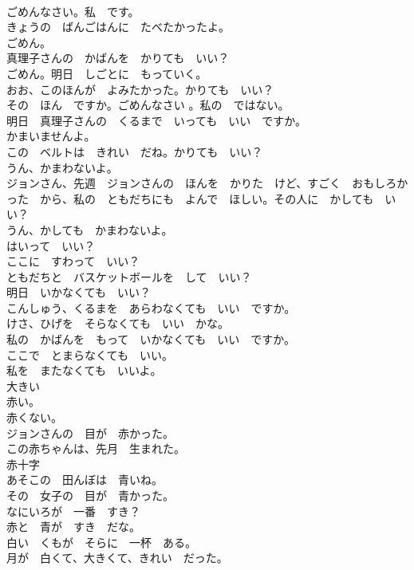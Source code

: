 \documentclass[8pt]{extreport}
\begin{document}
\begin{CJK}{UTF8}{min}
\\	ごめんなさい。私　です。	
\\	きょうの　ばんごはんに　たべたかったよ。	
\\	ごめん。	
\\	真理子さんの　かばんを　かりても　いい？	
\\	ごめん。明日　しごとに　もっていく。	
\\	おお、このほんが　よみたかった。かりても　いい？	
\\	その　ほん　ですか。ごめんなさい 。私の　ではない。	
\\	明日　真理子さんの　くるまで　いっても　いい　ですか。	
\\	かまいませんよ。	
\\	この　ベルトは　きれい　だね。かりても　いい？	
\\	うん、かまわないよ。	
\\	ジョンさん、先週　ジョンさんの　ほんを　かりた　けど、すごく　おもしろかった　から、私の　ともだちにも　よんで　ほしい。その人に　かしても　いい？	
\\	うん、かしても　かまわないよ。	
\\	はいって　いい？	
\\	ここに　すわって　いい？	
\\	ともだちと　バスケットボールを　して　いい？	
\\	明日　いかなくても　いい？	
\\	こんしゅう、くるまを　あらわなくても　いい　ですか。	
\\	けさ、ひげを　そらなくても　いい　かな。	
\\	私の　かばんを　もって　いかなくても　いい　ですか。	
\\	ここで　とまらなくても　いい。	
\\	私を　またなくても　いいよ。	
\\	大きい	
\\	赤い。	
\\	赤くない。	
\\	ジョンさんの　目が　赤かった。	
\\	この赤ちゃんは、先月　生まれた。	
\\	赤十字	
\\	あそこの　田んぼは　青いね。	
\\	その　女子の　目が　青かった。	
\\	なにいろが　一番　すき？	
\\	赤と　青が　すき　だな。	
\\	白い　くもが　そらに　一杯　ある。	
\\	月が　白くて、大きくて、きれい　だった。	

\end{CJK}
\end{document}
